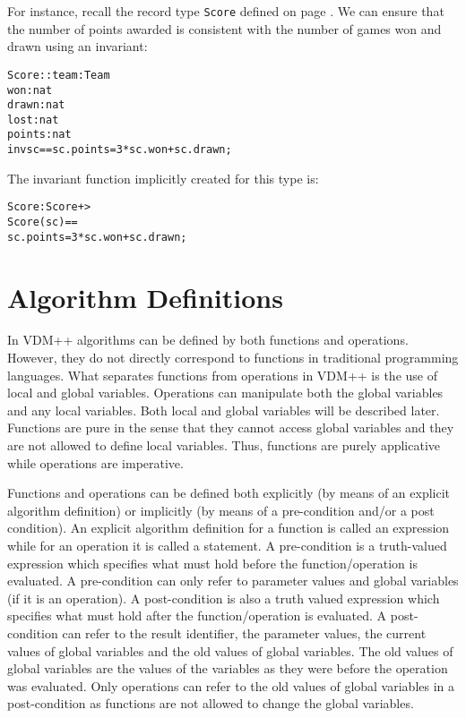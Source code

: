 \documentclass[\pformat,12pt]{article}
\newcommand{\vdmslpp}[2]{%
#2
}
\newcommand{\vdmsl}{VDM-SL}
\newcommand{\vdmpp}{VDM++}
\begin{document}
For instance, recall the record type \texttt{Score} defined on page
\pageref{scoredef}. We can ensure that the number of points awarded
is consistent with the number of games won and drawn using an invariant:
\begin{alltt}
  Score :: team : Team
           won : nat
           drawn : nat
           lost : nat
           points : nat
  inv sc == sc.points = 3 * sc.won + sc.drawn;
\end{alltt}
The invariant function implicitly created for this type is:
\begin{alltt}
  Score : Score +> 
  Score (sc) == 
    sc.points = 3 * sc.won + sc.drawn;
\end{alltt}

\section{Algorithm Definitions}
\label{algorithm}


In \vdmslpp{\vdmsl}{\vdmpp} algorithms can be defined by both
functions and operations.  However, they do not directly correspond to
functions in traditional programming languages. What separates
functions from operations in \vdmslpp{\vdmsl}{\vdmpp} is the use of
local and global variables. Operations can manipulate both the global
variables and any local variables.  Both
local and global variables will be described later. Functions are pure in
the sense that they cannot access global variables and they are not
allowed to define local variables. Thus, functions are purely
applicative while operations are imperative.

Functions and operations can be defined both explicitly (by means of
an explicit algorithm definition) or implicitly (by means of a
pre-condition and/or a post condition).  An explicit algorithm
definition for a function is called an expression while for an
operation it is called a statement.  A pre-condition is a truth-valued
expression which specifies what must hold before the
function/operation is evaluated. A pre-condition can only refer to
parameter values and global variables (if it is an operation).  A
post-condition is also a truth valued expression which specifies what
must hold after the function/operation is evaluated. A post-condition
can refer to the result identifier, the parameter values, the current
values of global variables and the old values of global variables. The
old values of global variables are the values of the variables as they
were before the operation was evaluated.  Only operations can refer to
the old values of global variables in a post-condition as functions
are not allowed to change the global variables.
\end{document}
